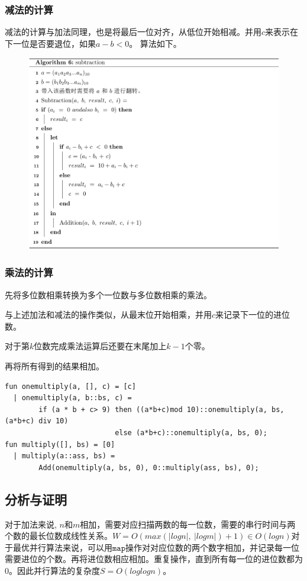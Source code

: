 \documentclass[UTF8,a4paperdui, %
]{ctexart}
\begin{document}
\subsubsection{减法的计算}
减法的计算与加法同理，也是将最后一位对齐，从低位开始相减。并用$c$来表示在下一位是否要退位，如果$a-b<0$。
算法如下。
\begin{figure}[ht]
\centering
\includegraphics[scale=0.56]{Substraction.png}
\end{figure}



\subsubsection{乘法的计算}
先将多位数相乘转换为多个一位数与多位数相乘的乘法。

与上述加法和减法的操作类似，从最末位开始相乘，并用$c$来记录下一位的进位数。

对于第$k$位数完成乘法运算后还要在末尾加上$k-1$个零。

再将所有得到的结果相加。

\begin{lstlisting}
fun onemultiply(a, [], c) = [c]
  | onemultiply(a, b::bs, c) = 
        if (a * b + c> 9) then ((a*b+c)mod 10)::onemultiply(a, bs, (a*b+c) div 10)
                          else (a*b+c)::onemultiply(a, bs, 0);
fun multiply([], bs) = [0]
  | multiply(a::ass, bs) = 
        Add(onemultiply(a, bs, 0), 0::multiply(ass, bs), 0);
\end{lstlisting}


\subsection{分析与证明}
对于加法来说, $n$和$m$相加，需要对应扫描两数的每一位数，需要的串行时间与两个数的最长位数成线性关系。$W=O(max(|logn|,\ |logm|)+1)\in O(logn)$对于最优并行算法来说，可以用$\texttt{map}$操作对对应位数的两个数字相加，并记录每一位需要进位的个数。再将进位数相应相加。重复操作，直到所有每一位的进位数都为0。因此并行算法的复杂度$S=O(loglogn)$。
\end{document}
